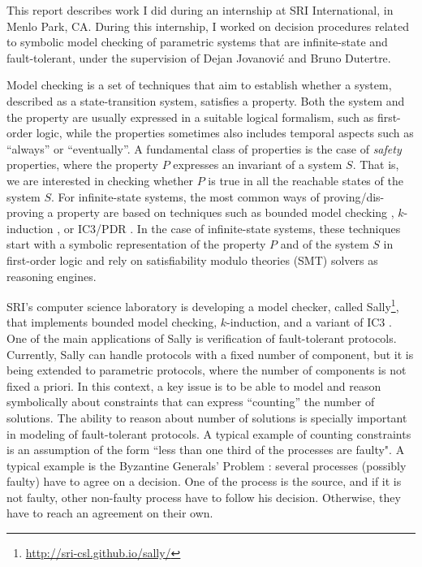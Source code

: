 
This report describes work I did during an internship at SRI
International, in Menlo Park, CA. During this internship, I worked on
decision procedures related to symbolic model checking of parametric
systems that are infinite-state and fault-tolerant, under the
supervision of Dejan Jovanović and Bruno Dutertre.

Model checking is a set of techniques that aim to establish whether a
system, described as a state-transition system, satisfies a property.
Both the system and the property are usually expressed in a suitable
logical formalism, such as first-order logic, while the properties
sometimes also includes temporal aspects such as ``always'' or
``eventually''. A fundamental class of properties is the case of
\emph{safety} properties, where the property $P$ expresses an
invariant of a system $S$. That is, we are interested in checking
whether $P$ is true in all the reachable states of the system $S$. For
infinite-state systems, the most common ways of proving/dis-proving a
property are based on techniques such as bounded model checking
\cite{biere2003bounded}, $k$-induction \cite{sheeran2000checking}, or
IC3/PDR \cite{pdr}. In the case of infinite-state systems, these
techniques start with a symbolic representation of the property $P$
and of the system $S$ in first-order logic and rely on satisfiability
modulo theories (SMT) solvers \cite{barrett2009satisfiability} as
reasoning engines.

SRI's computer science laboratory is developing a model checker,
called Sally\footnote{\url{http://sri-csl.github.io/sally/}}, that
implements bounded model checking, $k$-induction, and a variant of IC3
\cite{jovanovic2016property}. One of the main applications of Sally is
verification of fault-tolerant protocols. Currently, Sally can handle
protocols with a fixed number of component, but it is being extended
to parametric protocols, where the number of components is not fixed a
priori. In this context, a key issue is to be able to model and reason
symbolically about constraints that can express ``counting'' the
number of solutions. The ability to reason about number of solutions
is specially important in modeling of fault-tolerant protocols. A
typical example of counting constraints is an assumption of the form
``less than one third of the processes are faulty". A typical example is the
Byzantine Generals' Problem \cite{lamport}: several processes (possibly faulty) have to
agree on a decision. One of the process is the source, and if it is not faulty,
other non-faulty process have to follow his decision. Otherwise, they have to
reach an agreement on their own.

